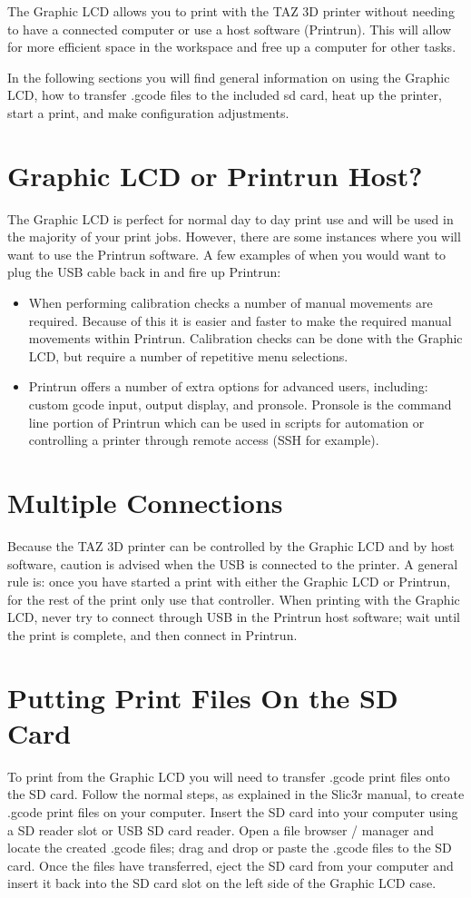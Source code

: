 
The Graphic LCD allows you to print with the TAZ 3D printer without needing to have a connected computer or use a host software (Printrun). This will allow for more efficient space in the workspace and free up a computer for other tasks.

In the following sections you will find general information on using the Graphic LCD, how to transfer .gcode files to the included sd card, heat up the printer, start a print, and make configuration adjustments.

\section{Graphic LCD or Printrun Host?}
The Graphic LCD is perfect for normal day to day print use and will be used in the majority of your print jobs. However, there are some instances where you will want to use the Printrun software. A few examples of when you would want to plug the USB cable back in and fire up Printrun:
\begin{itemize}
	\item When performing calibration checks a number of manual movements are required. Because of this it is easier and faster to make the required manual movements within Printrun. Calibration checks can be done with the Graphic LCD, but require a number of repetitive menu selections.
	\item Printrun offers a number of extra options for advanced users, including: custom gcode input, output display, and pronsole. Pronsole is the command line portion of Printrun which can be used in scripts for automation or controlling a printer through remote access (SSH for example).
\end{itemize}

\section{Multiple Connections}
Because the TAZ 3D printer can be controlled by the Graphic LCD and by host software, caution is advised when the USB is connected to the printer. A general rule is: once you have started a print with either the Graphic LCD or Printrun, for the rest of the print only use that controller. When printing with the Graphic LCD, never try to connect through USB in the Printrun host software; wait until the print is complete, and then connect in Printrun.

\section{Putting Print Files On the SD Card}
To print from the Graphic LCD you will need to transfer .gcode print files onto the SD card. Follow the normal steps, as explained in the Slic3r manual, to create .gcode print files on your computer. Insert the SD card into your computer using a SD reader slot or USB SD card reader. Open a file browser / manager and locate the created .gcode files; drag and drop or paste the .gcode files to the SD card. Once the files have transferred, eject the SD card from your computer and insert it back into the SD card slot on the left side of the Graphic LCD case.


